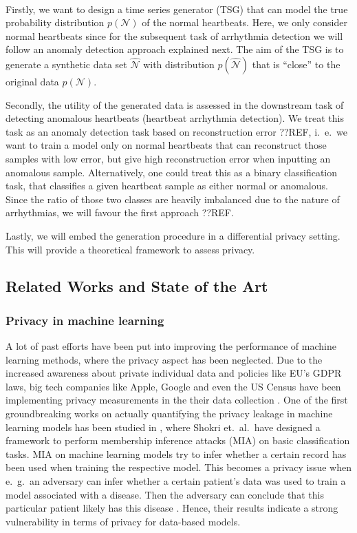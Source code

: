 \paragraph{}

Firstly, we want to design a time series generator (TSG) that can model the true probability distribution $p(\mathcal{N})$ of the normal heartbeats. Here, we only consider normal heartbeats since for the subsequent task of arrhythmia detection we will follow an anomaly detection approach explained next. The aim of the TSG is to generate a synthetic data set $\widehat{\mathcal{N}}$ with distribution $p(\widehat{\mathcal{N}})$ that is ``close'' to the original data $p(\mathcal{N})$.

Secondly, the utility of the generated data is assessed in the downstream task of detecting anomalous heartbeats (heartbeat arrhythmia detection). We treat this task as an anomaly detection task based on reconstruction error ??REF, i.\ e.\ we want to train a model only on normal heartbeats that can reconstruct those samples with low error, but give high reconstruction error when inputting an anomalous sample. Alternatively, one could treat this as a binary classification task, that classifies a given heartbeat sample as either normal or anomalous. Since the ratio of those two classes are heavily imbalanced due to the nature of arrhythmias, we will favour the first approach ??REF.

Lastly, we will embed the generation procedure in a differential privacy setting. This will provide a theoretical framework to assess privacy.

\subsection{Related Works and State of the Art}

\subsubsection*{Privacy in machine learning}
A lot of past efforts have been put into improving the performance of machine learning methods, where the privacy aspect has been neglected. Due to the increased awareness about private individual data and policies like EU's GDPR laws, big tech companies like Apple, Google and even the US Census have been implementing privacy measurements in the their data collection \parencite[see][]{dwork2019differential,abowd2019census}. One of the first groundbreaking works on actually quantifying the privacy leakage in machine learning models has been studied in \parencite{shokri2017membership}, where Shokri et.\ al.\ have designed a framework to perform membership inference attacks (MIA) on basic classification tasks. MIA on machine learning models try to infer whether a certain record has been used when training the respective model. This becomes a privacy issue when e.\ g.\ an adversary can infer whether a certain patient's data was used to train a model associated with a disease. Then the adversary can conclude that this particular patient likely has this disease \parencite[cf.][p. 5]{shokri2017membership}. Hence, their results indicate a strong vulnerability in terms of privacy for data-based models.


